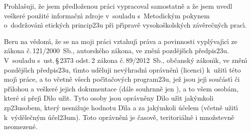 \documentclass[czech,bachelor,unicode]{ctufit-thesis}
\theoremstyle{plain}
\theoremstyle{definition}
\theoremstyle{remark}
\numberwithin{theorem}{chapter}
\begin{document}
\begin{declarationpage}
Prohla\v suji, \v ze jsem p\v redlo\v zenou pr\'aci vypracoval samostatn\v e a \v ze jsem uvedl ve\v sker\'e
pou\v zit\'e informa\v cn\'\i{} zdroje v~souladu s~Metodick\'ym pokynem o~do\-dr\v zo\-v\'an\'\i{} etick\'ych
princip\accent23u p\v ri p\v r\'\i{}prav\v e vysoko\v skolsk\'ych z\'av\v ere\v cn\'ych prac\'\i{}.

Beru na v\v edom\'\i{}, \v ze se na moji pr\'aci vztahuj\'\i{} pr\'ava a povinnosti vy\-pl\'y\-va\-j\'\i{}c\'\i{} ze z\'akona
\v c.\,121/2000~Sb., autorsk\'eho z\'akona, ve zn\v en\'\i{} pozd\v ej\v s\'\i{}ch p\v redpis\accent23u. V~souladu s~ust.\,\S{}\,2373 odst.\,2 z\'akona \v c.\,89/2012~Sb., ob\v cansk\'y z\'akon\'\i{}k, ve zn\v en\'\i{} pozd\v ej\v s\'\i{}ch p\v redpis\accent23u,
t\'\i{}mto ud\v eluji nev\'yhradn\'\i{} opr\'avn\v en\'\i{} (licenci) k~u\v zit\'\i{} t\'eto moj\'\i{} pr\'ace, a to v\v cetn\v e v\v sech
po\v c\'\i{}ta\v cov\'ych program\accent23u, je\v z jsou jej\'\i{} sou\v c\'ast\'\i{} \v ci p\v r\'\i{}lohou a ve\v sker\'e jejich
dokumentace (d\'ale souhrnn\v e jen ), a to v\v sem osob\'am, kter\'e si p\v rej\'\i{} D\'\i{}lo u\v z\'\i{}t.
Tyto osoby jsou opr\'avn\v eny D\'\i{}lo u\v z\'\i{}t jak\'ymkoli zp\accent23usobem, kter\'y nesni\v zuje hodnotu
D\'\i{}la a za jak\'ymkoli \'u\v celem (v\v cetn\v e u\v zit\'\i{} k~v\'yd\v ele\v cn\'ym \'u\v cel\accent23um). Toto opr\'avn\v en\'\i{} je
\v casov\v e, teritori\'aln\v e i mno\v zstevn\v e neomezen\'e. 

\end{declarationpage}

\printabstractpage %
\end{document}

